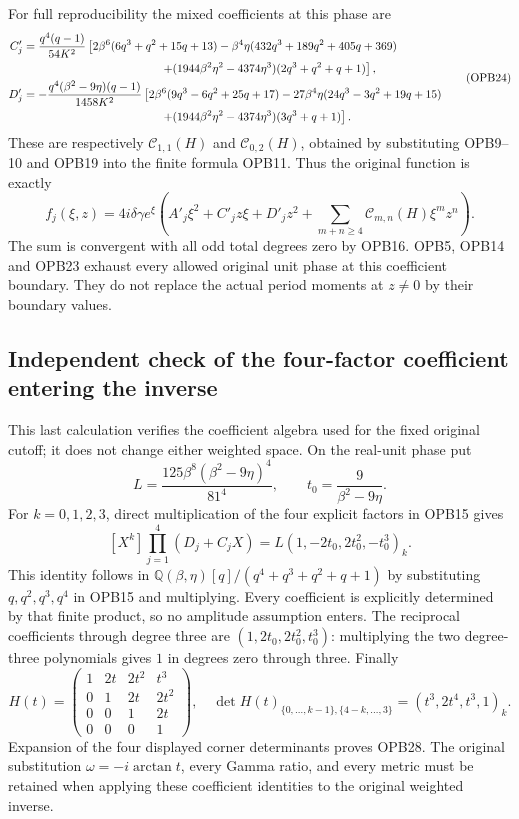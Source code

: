 For full reproducibility the mixed coefficients at this phase are
\[
 \begin{split}
 C'_j&=\frac{q^4(q-1)}{54K^2}\left[
 2\beta^6(6q^3+q^2+15q+13)
 -\beta^4\eta(432q^3+189q^2+405q+369)\right.\\
 &\hspace{42mm}\left.
 +(1944\beta^2\eta^2-4374\eta^3)(2q^3+q^2+q+1)\right],\\
 D'_j&=-\frac{q^4(\beta^2-9\eta)(q-1)}{1458K^2}\left[
 2\beta^6(9q^3-6q^2+25q+17)
 -27\beta^4\eta(24q^3-3q^2+19q+15)\right.\\
 &\hspace{42mm}\left.
 +(1944\beta^2\eta^2-4374\eta^3)(3q^3+q+1)\right].
 \end{split}\tag{OPB24}
\]
These are respectively $\mathcal C_{1,1}(H)$ and
$\mathcal C_{0,2}(H)$, obtained by substituting OPB9--10 and OPB19
into the finite formula OPB11. Thus the original function is exactly
\[
 f_j(\xi,z)=4i\delta\gamma e^\xi
 \left(A'_j\xi^2+C'_jz\xi+D'_jz^2+
       \sum_{m+n\ge4}\mathcal C_{m,n}(H)\xi^mz^n\right).
 \tag{OPB25}
\]
The sum is convergent with all odd total degrees zero by OPB16.
OPB5, OPB14 and OPB23 exhaust every allowed original unit phase at
this coefficient boundary. They do not replace the actual period
moments at $z\ne0$ by their boundary values.

\subsection{Independent check of the four-factor coefficient entering the inverse}
This last calculation verifies the coefficient algebra used for the
fixed original cutoff; it does not change either weighted space.
On the real-unit phase put
\[
 L=\frac{125\beta^8(\beta^2-9\eta)^4}{81^4},\qquad
 t_0=\frac9{\beta^2-9\eta}.
 \tag{OPB26}
\]
For $k=0,1,2,3$, direct multiplication of the four explicit factors
in OPB15 gives
\[
 [X^k]\prod_{j=1}^4(D_j+C_jX)
       =L(1,-2t_0,2t_0^2,-t_0^3)_k.
 \tag{OPB27}
\]
This identity follows in $\mathbb Q(\beta,\eta)[q]/
(q^4+q^3+q^2+q+1)$ by substituting $q,q^2,q^3,q^4$ in
OPB15 and multiplying. Every coefficient is explicitly determined
by that finite product, so no amplitude assumption enters.
The reciprocal coefficients through degree three are
$(1,2t_0,2t_0^2,t_0^3)$: multiplying the two degree-three
polynomials gives $1$ in degrees zero through three. Finally
\[
 H(t)=\begin{pmatrix}
 1&2t&2t^2&t^3\\0&1&2t&2t^2\\0&0&1&2t\\0&0&0&1
 \end{pmatrix},\quad
 \det H(t)_{\{0,\ldots,k-1\},\{4-k,\ldots,3\}}
       =(t^3,2t^4,t^3,1)_k.
 \tag{OPB28}
\]
Expansion of the four displayed corner determinants proves OPB28.
The original substitution $\omega=-i\arctan t$, every Gamma ratio,
and every metric must be retained when applying these coefficient
identities to the original weighted inverse.
